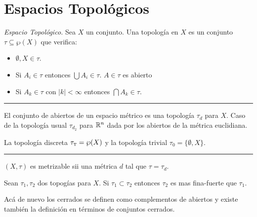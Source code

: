 \section*{Espacios Topológicos}

\begin{definition}
    \emph{Espacio Topológico.} Sea \(X\) un conjunto. Una topología en \(X\) es un conjunto \(\tau \subseteq \wp(X)\) que verifica:  
    \begin{itemize}
        \item \(\emptyset,X\in \tau\). 
        \item Si \(A_i \in \tau\) entonces \( \bigcup A_i \in \tau\). \hfill \(A\in \tau\) es abierto
        \item Si \(A_k \in \tau\) con \(|k|<\infty \) entonces \(\bigcap A_k\in \tau\). 
    \end{itemize}
\end{definition}

\E

\hrule 
\begin{example}
    El conjunto de abiertos de un espacio métrico es una topología \(\tau_d\) para \(X\). Caso de la topología usual \(\tau_{d_2}\)  para \(\mathbb{R}^n\) dada por los abiertos de la métrica euclidiana. 
\end{example}
\begin{example}
    La topología discreta \(\tau_{\text{\tiny T}}= \wp(X)\) y la topología trivial \(\tau_0 = \{\emptyset, X\}\). 
\end{example}
\hrule

\E 

\begin{definition}
    \((X,\tau)\) es metrizable sii una métrica \(d\) tal que \(\tau = \tau_d\). 
\end{definition}

\begin{definition}
    Sean \(\tau_1,\tau_2\) dos topogías para \(X\). Si \(\tau_1\subset \tau_2\) entonces \(\tau_2\) es mas fina-fuerte que \(\tau_1\). 
\end{definition}

\begin{note}
    Acá de nuevo los cerrados se definen como complementos de abiertos y existe también la definición en términos de conjuntos cerrados. 
\end{note}
